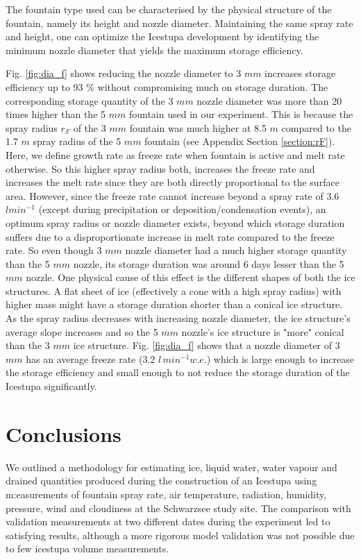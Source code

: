 \documentclass[utf8]{frontiersSCNS} %
\begin{document}
The fountain type used can be characterised by the physical structure of the fountain, namely its height and nozzle
diameter. Maintaining the same spray rate and height, one can optimize the Icestupa development by identifying the
minimum nozzle diameter that yields the maximum storage efficiency. 

Fig. \ref{fig:dia_f} shows reducing the nozzle diameter to 3 $mm$ increases storage efficiency up to 93 \% without
compromising much on storage duration.  The corresponding storage quantity of the 3 $mm$ nozzle diameter was more than
20 times higher than the 5 $mm$ fountain used in our experiment. This is because the spray radius $r_F$ of the 3 $mm$
fountain was much higher at 8.5 $m$ compared to the 1.7 $m$ spray radius of the 5 $mm$ fountain (see Appendix Section
\ref{section:rF}). Here, we define growth rate as freeze rate when fountain is active and melt rate otherwise. So this
higher spray radius both, increases the freeze rate  and increases the melt rate since they are both directly
proportional to the surface area. However, since the freeze rate cannot increase beyond a spray rate of 3.6 $l
min^{-1}$ (except during precipitation or deposition/condensation events), an optimum spray radius or nozzle diameter
exists, beyond which storage duration suffers due to a disproportionate increase in melt rate compared to the freeze
rate. So even though 3 $mm$ nozzle diameter had a much higher storage quantity than the 5 $mm$ nozzle, its storage
duration was around 6 days lesser than the 5 $mm$ nozzle. One physical cause of this effect is the different shapes of
both the ice structures. A flat sheet of ice (effectively a cone with a high spray radius) with higher mass might have
a storage duration shorter than a conical ice structure. As the spray radius decreases with increasing nozzle
diameter, the ice structure’s average slope increases and so the 5 $mm$ nozzle's ice structure is "more" conical than
the 3 $mm$ ice structure. Fig.  \ref{fig:dia_f} shows that a nozzle diameter of 3 $mm$ has an average freeze rate (3.2
$l \,min^{-1} w.e.$) which is large enough to increase the storage efficiency and small enough to not reduce the
storage duration of the Icestupa significantly.

\section{Conclusions} We outlined a methodology for estimating ice, liquid water, water vapour and drained
quantities produced during the construction of an Icestupa using m:easurements of fountain spray rate, air temperature,
radiation, humidity, pressure, wind and cloudiness at the Schwarzsee study site. The comparison with validation
measurements at two different dates during the experiment led to satisfying results, although a more rigorous model
validation was not possible due to few icestupa volume measurements.
\end{document}
